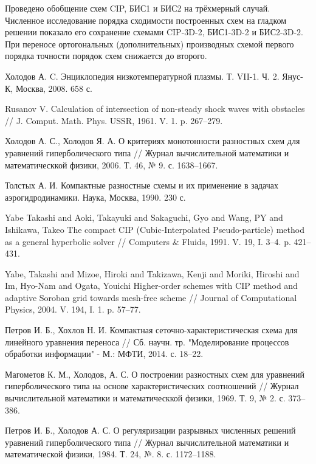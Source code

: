 \documentclass[11pt]{article}
\begin{document}
Проведено обобщение схем CIP, БИС1 и БИС2 на трёхмерный случай.
Численное исследование порядка сходимости построенных схем на гладком решении показало его сохранение схемами
CIP-3D-2, БИС1-3D-2 и БИС2-3D-2.
При переносе ортогональных (дополнительных) производных схемой первого порядка точности порядок схем снижается до второго.

\begin{thebibliography}{99}

Холодов А. C. Энциклопедия низкотемпературной плазмы. Т. VII-1. Ч. 2. Янус-К, Москва, 2008. 658 с.

Rusanov V. Calculation of intersection of non-steady shock waves with obstacles // J. Comput. Math. Phys. USSR, 1961. V. 1. p. 267--279.

Холодов А. С., Холодов Я. А. О критериях монотонности разностных схем для уравнений гиперболического типа // Журнал вычислительной математики и математическкой физики, 2006. Т. 46, № 9. с. 1638--1667.

Толстых А. И. Компактные разностные схемы и их применение в задачах аэрогидродинамики. Наука, Москва, 1990. 230 с.

Yabe Takashi and Aoki, Takayuki and Sakaguchi, Gyo and Wang, PY and Ishikawa, Takeo The compact CIP (Cubic-Interpolated Pseudo-particle) method as a general hyperbolic solver // Computers \& Fluids, 1991. V. 19, I. 3--4. p. 421--431.

Yabe, Takashi and Mizoe, Hiroki and Takizawa, Kenji and Moriki, Hiroshi and Im, Hyo-Nam and Ogata, Youichi  Higher-order schemes with CIP method and adaptive Soroban grid towards mesh-free scheme // Journal of Computational Physics, 2004. V. 194, I. 1. p. 57--77.

Петров И. Б., Хохлов Н. И. Компактная сеточно-характеристическая схема для линейного уравнения переноса // Сб. научн. тр. "Моделирование процессов обработки информации" - М.: МФТИ, 2014. с. 18--22.

Магометов К. М., Холодов, А. С. О построении разностных схем для уравнений гиперболического типа на основе характеристических соотношений // Журнал вычислительной математики и математическкой физики, 1969. Т. 9, № 2. с. 373--386.

Петров И. Б., Холодов А. С. О регуляризации разрывных численных решений уравнений гиперболического типа // Журнал вычислительной математики и математической физики, 1984. Т. 24, №. 8. с. 1172--1188.


\end{thebibliography}
\end{document}
